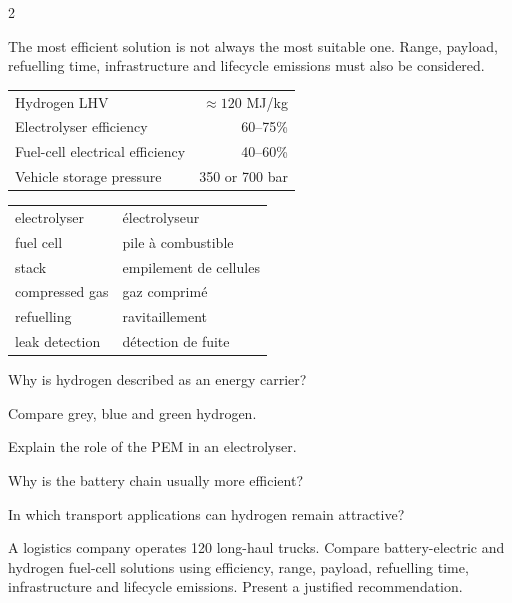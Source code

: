 \begin{multicols}{2}
\begin{tcolorbox}[colback=yellow!10,colframe=ECOrange,title=\sffamily\bfseries Engineering Insight]
The most efficient solution is not always the most suitable one. Range, payload, refuelling time, infrastructure and lifecycle emissions must also be considered.
\end{tcolorbox}

\begin{tcolorbox}[colback=blue!5,colframe=ECBlue,title=\sffamily\bfseries Key Figures]
\begin{tabularx}{\linewidth}{@{}Xr@{}}
Hydrogen LHV & $\approx120$ MJ/kg\\
Electrolyser efficiency & 60--75\%\\
Fuel-cell electrical efficiency & 40--60\%\\
Vehicle storage pressure & 350 or 700 bar
\end{tabularx}
\end{tcolorbox}

\begin{vocabulary}
\begin{tabularx}{\linewidth}{@{}lX@{}}
electrolyser & électrolyseur\\
fuel cell & pile à combustible\\
stack & empilement de cellules\\
compressed gas & gaz comprimé\\
refuelling & ravitaillement\\
leak detection & détection de fuite
\end{tabularx}
\end{vocabulary}

\begin{questions}
\item Why is hydrogen described as an energy carrier?
\item Compare grey, blue and green hydrogen.
\item Explain the role of the PEM in an electrolyser.
\item Why is the battery chain usually more efficient?
\item In which transport applications can hydrogen remain attractive?
\end{questions}

\begin{challenge}
A logistics company operates 120 long-haul trucks. Compare battery-electric and hydrogen fuel-cell solutions using efficiency, range, payload, refuelling time, infrastructure and lifecycle emissions. Present a justified recommendation.
\end{challenge}


\end{multicols}
